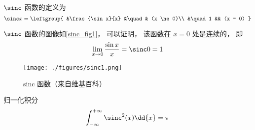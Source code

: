 
$\sinc$ 函数的定义为
\begin{equation}
\sinc x = 
\leftgroup{
&\frac{\sin x}{x} &\quad & (x \ne 0)\\
&\quad 1 && (x = 0)
}\end{equation}

$\sinc$ 函数的图像如\autoref{sinc_fig1}， 可以证明， 该函数在 $x=0$ 处是连续的， 即
\begin{equation}
\lim_{x \to 0}\frac{\sin x}{x} = \sinc 0 = 1
\end{equation}

\begin{figure}[ht]
\centering
\texttt{[image: ./figures/sinc1.png]}
\caption{sinc 函数（来自维基百科）} \label{sinc_fig1}
\end{figure}

归一化积分
\begin{equation}
\int_{-\infty}^{+\infty} \sinc^2(x) \dd{x} = \pi
\end{equation}
